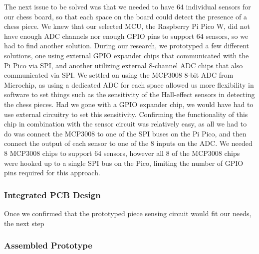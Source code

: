 \documentclass[11pt,journal]{IEEEtran}
\begin{document}
The next issue to be solved was that we needed to have 64 individual sensors for our chess board, so that each space on the board could detect the presence of a chess piece. We knew that our selected MCU, the Raspberry Pi Pico W, did not have enough ADC channels nor enough GPIO pins to support 64 sensors, so we had to find another solution. During our research, we prototyped a few different solutions, one using external GPIO expander chips that communicated with the Pi Pico via SPI, and another utilizing external 8-channel ADC chips that also communicated via SPI. We settled on using the MCP3008 8-bit ADC from Microchip, as using a dedicated ADC for each space allowed us more flexibility in software to set things such as the sensitivity of the Hall-effect sensors in detecting the chess pieces. Had we gone with a GPIO expander chip, we would have had to use external circuitry to set this sensitivity. Confirming the functionality of this chip in combination with the sensor circuit was relatively easy, as all we had to do was connect the MCP3008 to one of the SPI buses on the Pi Pico, and then connect the output of each sensor to one of the 8 inputs on the ADC. We needed 8 MCP3008 chips to support 64 sensors, however all 8 of the MCP3008 chips were hooked up to a single SPI bus on the Pico, limiting the number of GPIO pins required for this approach.
\subsubsection{Integrated PCB Design}
Once we confirmed that the prototyped piece sensing circuit would fit our needs, the next step 
\subsubsection{Assembled Prototype}
\end{document}
